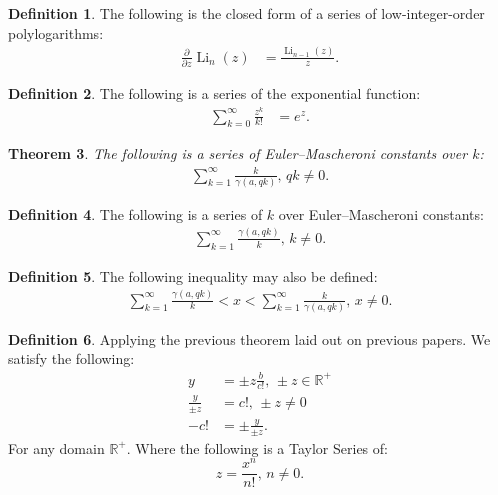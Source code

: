 \documentclass[10pt]{article}
\theoremstyle{plain}
\newtheorem{theorem}{Theorem}[section]
\theoremstyle{definition}
\newtheorem{definition}[theorem]{Definition}
\theoremstyle{remark}
\begin{document}
\begin{definition}
	The following is the closed form of a series of low-integer-order polylogarithms:
	\begin{align*}
		\frac{\partial}{\partial z} \operatorname{Li}_{n}(z) &= \frac{\operatorname{Li}_{n-1}(z)}{z}.
	\end{align*}
\end{definition}

\begin{definition}
	The following is a series of the exponential function:
	\begin{align*}
		\sum_{k=0}^{\infty} \frac{z^k}{k!} &= e^{z}.
	\end{align*}
\end{definition}

\begin{theorem}
	The following is a series of Euler–Mascheroni constants over $k$:
	\begin{align*}
		\sum_{k=1}^{\infty} \frac{k}{\gamma(a, qk)}, \, qk \neq 0.
	\end{align*}
\end{theorem}

\begin{definition}
	\label{theo:2.19}
	The following is a series of $k$ over Euler–Mascheroni constants:
	\begin{align*}
		\sum_{k=1}^{\infty} \frac{\gamma(a, qk)}{k}, \, k \neq 0.
	\end{align*}
\end{definition}

\begin{definition}
	The following inequality may also be defined:
	\begin{align*}
		\sum_{k=1}^{\infty} \frac{\gamma(a, qk)}{k} < x < \sum_{k=1}^{\infty} \frac{k}{\gamma(a, qk)}, \, x \neq 0.
	\end{align*}
\end{definition}

\begin{definition}
	Applying the previous theorem laid out on previous papers. We satisfy the following:
	\begin{align*}
		y &= \pm z \frac{b}{c!}, \, \pm z \in \mathbb{R}^{+}\\
		\frac{y}{\pm z} &= c!, \, \pm z \neq 0\\
		-c! &= \pm \frac{y}{\pm z}.
	\end{align*}
	For any domain $\mathbb{R}^{+}$. Where the following is a Taylor Series of:
	\begin{equation}
		z = \frac{x^n}{n!}, \, n \neq 0.
	\end{equation}
\end{definition}
\end{document}
